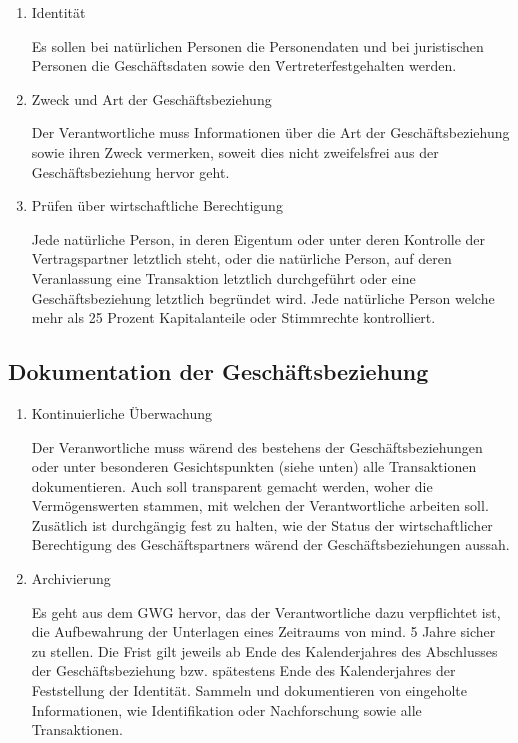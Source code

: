 \documentclass{article}
\begin{document}
        \begin{enumerate}

            \item Identität

                Es sollen bei natürlichen Personen die Personendaten und bei juristischen Personen die Geschäftsdaten sowie den \"Vertreter\" festgehalten werden.

            \item Zweck und Art der Geschäftsbeziehung

                Der Verantwortliche muss Informationen über die Art der Geschäftsbeziehung sowie ihren Zweck vermerken, soweit dies nicht zweifelsfrei aus der Geschäftsbeziehung hervor geht.


            \item Prüfen über wirtschaftliche Berechtigung
     
                Jede natürliche Person, in deren Eigentum oder unter deren Kontrolle der Vertragspartner letztlich steht, oder die natürliche Person, auf deren Veranlassung eine Transaktion letztlich durchgeführt oder eine Geschäftsbeziehung letztlich begründet wird.
                Jede natürliche Person welche mehr als 25 Prozent Kapitalanteile oder Stimmrechte kontrolliert.

        \end{enumerate}           


        \subsection[Dokumentation der Geschäftsbeziehung]{Dokumentation der Geschäftsbeziehung}

        \begin{enumerate}

            \item Kontinuierliche Überwachung

                Der Veranwortliche muss wärend des bestehens der Geschäftsbeziehungen oder unter besonderen Gesichtspunkten (siehe unten) alle Transaktionen dokumentieren. Auch soll transparent gemacht werden, woher die Vermögenswerten stammen, mit welchen der Verantwortliche arbeiten soll.
                Zusätlich ist durchgängig fest zu halten, wie der Status der wirtschaftlicher Berechtigung des Geschäftspartners wärend der Geschäftsbeziehungen aussah.

            \item Archivierung

                Es geht aus dem GWG hervor, das der Verantwortliche dazu verpflichtet ist, die Aufbewahrung der Unterlagen eines Zeitraums von mind. 5 Jahre sicher zu stellen.
                Die Frist gilt jeweils ab Ende des Kalenderjahres des Abschlusses der Geschäftsbeziehung bzw. spätestens Ende des Kalenderjahres der Feststellung der Identität.
                Sammeln und dokumentieren von eingeholte Informationen, wie Identifikation oder Nachforschung sowie alle Transaktionen.

        \end{enumerate}  
        
\end{document}
